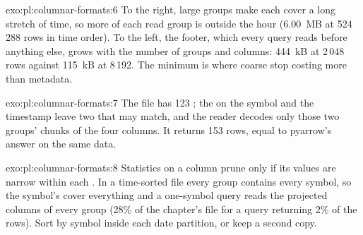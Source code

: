 \begin{solution}{exo:pl:columnar-formats:6}
To the right, large groups make each  cover a long stretch of time, so more of each read group is outside the hour
(6.00~MB at 524\,288 rows in time order). To the left, the footer, which every query reads before anything else, grows with the
number of groups and columns: 444~kB at 2\,048 rows against 115~kB at 8\,192. The minimum is where coarse  stop costing
more than metadata.
\end{solution}

\begin{solution}{exo:pl:columnar-formats:7}
The file has 123 ; the  on the symbol and the timestamp leave two that may match, and the reader decodes only
those two groups' chunks of the four columns. It returns 153 rows, equal to pyarrow's answer on the same data.
\end{solution}

\begin{solution}{exo:pl:columnar-formats:8}
Statistics on a column prune only if its values are narrow within each . In a time-sorted file every group contains every
symbol, so the symbol's  cover everything and a one-symbol query reads the projected columns of every group (28\% of the
chapter's file for a query returning 2\% of the rows). Sort by symbol inside each date partition, or keep a second copy.
\end{solution}

